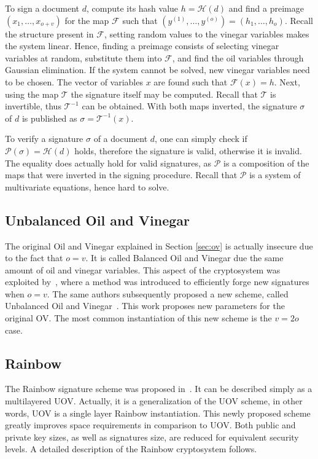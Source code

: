 \documentclass{ufsctex/ufsctex}
\begin{document}
To sign a document $d$, compute its hash value $h = \mathcal{H}(d)$ and find a
preimage $(x_1,\dots,x_{o+v})$ for the map $\mathcal{F}$ such that
$(y^{(1)},\dots,y^{(o)}) = (h_1,\dots,h_o)$. Recall the structure present in
$\mathcal{F}$, setting random values to the vinegar variables makes the system
linear. Hence, finding a preimage consists of selecting vinegar variables at
random, substitute them into $\mathcal{F}$, and find the oil variables through
Gaussian elimination. If the system cannot be solved, new vinegar variables
need to be chosen. The vector of variables $x$ are found such that
$\mathcal{F}(x)=h$. Next, using the map $\mathcal{T}$ the signature itself may
be computed. Recall that $\mathcal{T}$ is invertible, thus $\mathcal{T}^{-1}$
can be obtained. With both maps inverted, the signature $\sigma$ of $d$ is
published as $\sigma = \mathcal{T}^{-1}(x)$.

To verify a signature $\sigma$ of a document $d$, one can simply check if
$\mathcal{P}(\sigma) = \mathcal{H}(d)$ holds, therefore the signature is valid,
otherwise it is invalid. The equality does actually hold for valid signatures,
as $\mathcal{P}$ is a composition of the maps that were inverted in the signing
procedure. Recall that $\mathcal{P}$ is a system of multivariate equations,
hence hard to solve.

\subsection{Unbalanced Oil and Vinegar}

The original Oil and Vinegar explained in Section \ref{sec:ov} is actually
insecure due to the fact that $o = v$. It is called Balanced Oil and Vinegar
due the same amount of oil and vinegar variables. This aspect of the
cryptosystem was exploited by~\cite{kipnis1998cryptanalysis}, where a method
was introduced to efficiently forge new signatures when $o = v$. The same
authors subsequently proposed a new scheme, called Unbalanced Oil and
Vinegar~\cite{kipnis1999unbalanced}. This work proposes new parameters for the
original OV. The most common instantiation of this new scheme is the $v = 2o$
case.

\subsection{Rainbow}\label{sec:rainbow}

The Rainbow signature scheme was proposed in~\cite{ding2005rainbow}. It can be
described simply as a multilayered UOV. Actually, it is a generalization of the
UOV scheme, in other words, UOV is a single layer Rainbow instantiation. This
newly proposed scheme greatly improves space requirements in comparison to UOV.
Both public and private key sizes, as well as signatures size, are reduced for
equivalent security levels. A detailed description of the Rainbow cryptosystem
follows.
\end{document}

